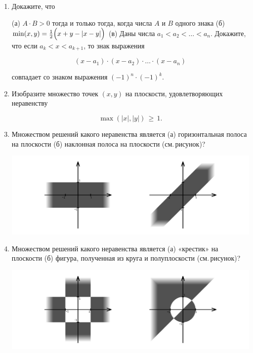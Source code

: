 \begin{enumerate}
\item Докажите, что

\subitem (а) $A \cdot B > 0$ тогда и только тогда, когда числа $A$ и $B$ одного знака\scolon
\subitem (б) $\min (x,y) = \frac{1}{2} \Bigl( x + y - |x - y| \Bigr)$\scolon
\subitem (в) Даны числа $a_1 < a_2 < \ldots < a_n$. Докажите, что если $a_k < x < a_{k+1}$, то знак выражения

\vspace{-0.3cm}
$$(x-a_1)\cdot (x-a_2)\cdot \ldots \cdot (x-a_n)$$

\vspace{-0.15cm}
совпадает со знаком выражения $(-1)^n \cdot (-1)^k$.

\item Изобразите множество точек $(x,y)$ на плоскости, удовлетворяющих неравенству

\vspace{-0.3cm}
$$\max(|x|, |y|)\,\geq\,1.$$

\item Множеством решений какого неравенства является (а) горизонтальная полоса на плоскости (б) наклонная полоса на плоскости (см.\,рисунок)?

\centerline{\includegraphics[width=13.75cm]{stats/2018/graph/1}}

\item Множеством решений какого неравенства является (а) «крестик» на плоскости (б) фигура, полученная из круга и полуплоскости (см.\,рисунок)?

\centerline{\includegraphics[width=13.75cm]{stats/2018/graph/2}}


\end{enumerate}
